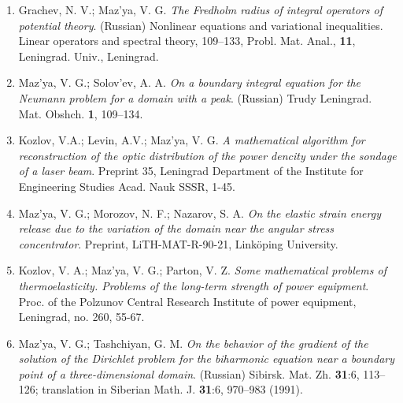 \documentclass{article}
\begin{document}
\begin{enumerate}
{\bf 1990}
\item Grachev, N. V.; Maz'ya, V. G. {\it The Fredholm radius of
integral
operators of potential theory}. (Russian) Nonlinear
equations and variational inequalities. Linear operators and spectral
theory, 109--133, Probl. Mat. Anal., {\bf 11},
Leningrad. Univ., Leningrad.
\item Maz'ya, V. G.; Solov'ev, A. A. {\it On a boundary integral
equation
for the Neumann
problem for a domain with a peak}. (Russian) Trudy Leningrad. Mat.
Obshch.
{\bf 1}, 109--134.
\item Kozlov, V.A.; Levin, A.V.; Maz'ya, V. G. {\it A mathematical
algorithm
 for reconstruction of the
optic distribution of the power dencity under the
sondage of a laser beam}. Preprint 35, Leningrad Department of the
Institute for Engineering Studies Acad. Nauk SSSR, 1-45.


\item Maz'ya, V. G.; Morozov, N. F.; Nazarov, S. A. {\it On the
elastic
strain energy release due to the variation of the domain
near the angular stress concentrator}. Preprint, LiTH-MAT-R-90-21,
Link\"oping University.
\item Kozlov, V. A.; Maz'ya, V. G.; Parton, V. Z. {\it Some
mathematical
problems of thermoelasticity. Problems of the long-term
strength of power equipment}. Proc. of the Polzunov Central Research
Institute of power equipment, Leningrad, no. 260,
55-67.
\item Maz'ya, V. G.; Tashchiyan, G. M. {\it On the behavior of the
gradient
of the solution of the Dirichlet problem
for the biharmonic equation near a boundary point of a
three-dimensional
domain}. (Russian) Sibirsk. Mat. Zh. {\bf 31}:6,
113--126; translation in Siberian Math. J. {\bf 31}:6, 970--983
(1991).
\hfill\break


\end{enumerate}
\end{document}
